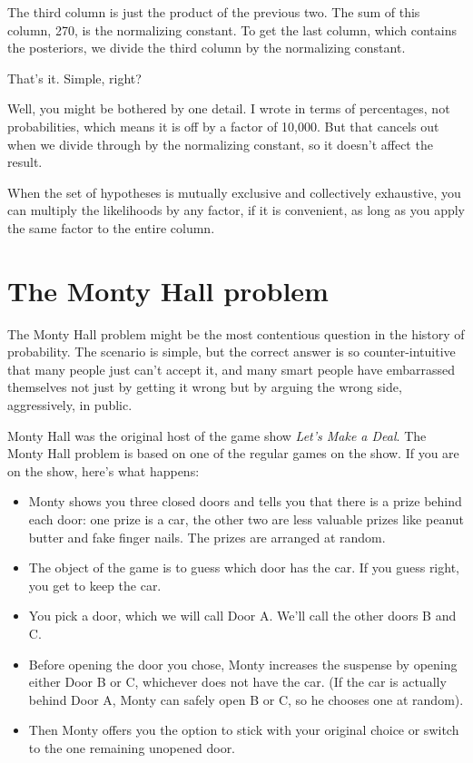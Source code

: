 \documentclass[12pt]{book}
\begin{document}
The third column is just the product of the previous two.
The sum of this column, 270, is the normalizing constant.
To get the last column, which contains the posteriors, we divide
the third column by the normalizing constant.

That's it.  Simple, right?

Well, you might be bothered by one detail.  I wrote 
in terms of percentages, not probabilities, which means it
is off by a factor of 10,000.  But that
cancels out when we divide through by the normalizing constant, so
it doesn't affect the result.

When the set of hypotheses is mutually exclusive and collectively
exhaustive, you can multiply the likelihoods by any factor, if it is
convenient, as long as you apply the same factor to the entire column.


\section{The Monty Hall problem}

The Monty Hall problem might be the most contentious question in
the history of probability.  The scenario is simple, but the correct
answer is so counter-intuitive that many people just can't accept
it, and many smart people have embarrassed themselves not just by
getting it wrong but by arguing the wrong side, aggressively,
in public.

Monty Hall was the original host of the game show {\em Let's Make a
Deal}.  The Monty Hall problem is based on one of the regular
games on the show.  If you are on the show, here's what happens:

\begin{itemize}

\item Monty shows you three closed doors and tells you that there is a
  prize behind each door: one prize is a car, the other two are less
  valuable prizes like peanut butter and fake finger nails.  The
  prizes are arranged at random.

\item The object of the game is to guess which door has the car.  If
  you guess right, you get to keep the car.

\item You pick a door, which we will call Door A.  We'll call the
  other doors B and C.

\item Before opening the door you chose, Monty increases the
  suspense by opening either Door B or C, whichever does not
  have the car.  (If the car is actually behind Door A, Monty can
  safely open B or C, so he chooses one at random).

\item Then Monty offers you the option to stick with your original
  choice or switch to the one remaining unopened door.

\end{itemize}
\end{document}
